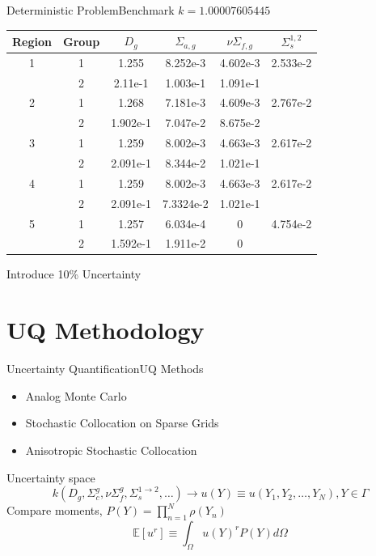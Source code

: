 \documentclass{beamer}
\newcommand{\expv}[1]{\ensuremath{\mathbb{E}[ #1]}}
\newcommand{\xs}[2]{\ensuremath{\Sigma_{#1}^{(#2)}}}
\begin{document}

\begin{frame}{Deterministic Problem}{Benchmark}\vspace{-20pt}
$k=1.00007605445$
\scriptsize
\begin{table}[h]
\centering
\begin{tabular}{c c | c c c c}
Region & Group & $D_g$ & $\Sigma_{a,g}$ & $\nu\Sigma_{f,g}$ & $\Sigma_s^{1,2}$ \\ \hline
1 & 1 & 1.255 & 8.252e-3 & 4.602e-3 & 2.533e-2 \\
 & 2 & 2.11e-1 & 1.003e-1 & 1.091e-1 & \\ \hline
2 & 1 & 1.268 & 7.181e-3 & 4.609e-3 & 2.767e-2 \\
 & 2 & 1.902e-1 & 7.047e-2 & 8.675e-2 & \\ \hline
3 & 1 & 1.259 & 8.002e-3 & 4.663e-3 & 2.617e-2 \\
 & 2 & 2.091e-1 & 8.344e-2 & 1.021e-1 & \\ \hline
4 & 1 & 1.259 & 8.002e-3 & 4.663e-3 & 2.617e-2 \\
 & 2 & 2.091e-1 & 7.3324e-2 & 1.021e-1 & \\ \hline
5 & 1 & 1.257 & 6.034e-4 & 0 & 4.754e-2 \\
 & 2 & 1.592e-1 & 1.911e-2 & 0 & 
\end{tabular}
\end{table}\normalsize
Introduce 10\% Uncertainty
\end{frame}

\section{UQ Methodology}
\begin{frame}{Uncertainty Quantification}{UQ Methods}\vspace{-20pt}
\begin{itemize}
\item Analog Monte Carlo
\item Stochastic Collocation on Sparse Grids
\item Anisotropic Stochastic Collocation
\end{itemize}
Uncertainty space
\[k(D_g,\Sigma_c^g,\nu\Sigma_f^g,\Sigma_s^{1\to2},\ldots) \to u(Y)\equiv u(Y_1,Y_2,\ldots,Y_N),Y\in\Gamma\]%
Compare moments, $P(Y)=\prod_{n=1}^N \rho(Y_n)$
\[\expv{u^r}\equiv\int_\Omega u(Y)^rP(Y)d\Omega\]
\end{frame}
\end{document}
